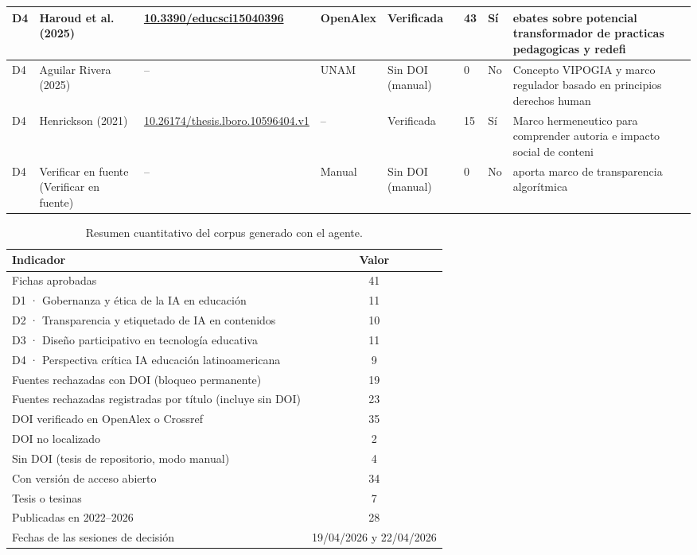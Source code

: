 {\begin{longtable}{|p{0.55cm}|p{2.6cm}|p{2.8cm}|p{1.3cm}|p{1.6cm}|p{0.8cm}|p{0.45cm}|p{2.4cm}|}
\hline
D4 & Haroud et al. (2025) & {\scriptsize \url{10.3390/educsci15040396}} & OpenAlex & Verificada & 43 & Sí & ebates sobre potencial transformador de practicas pedagogicas y redefi \\
\hline
D4 & Aguilar Rivera (2025) & {\scriptsize --} & UNAM & Sin DOI (manual) & 0 & No & Concepto VIPOGIA y marco regulador basado en principios derechos human \\
\hline
D4 & Henrickson (2021) & {\scriptsize \url{10.26174/thesis.lboro.10596404.v1}} & -- & Verificada & 15 & Sí & Marco hermeneutico para comprender autoria e impacto social de conteni \\
\hline
D4 & Verificar en fuente (Verificar en fuente) & {\scriptsize --} & Manual & Sin DOI (manual) & 0 & No & aporta marco de transparencia algorítmica \\
\hline
\end{longtable}}

\begin{table}[H]\centering\footnotesize
\caption{Resumen cuantitativo del corpus generado con el agente.}\label{tab:resumen-corpus}
\renewcommand{\arraystretch}{1.3}
\begin{tabular}{|p{9.5cm}|c|}\hline\rowcolor{bgCotejo}\textbf{Indicador} & \textbf{Valor} \\\hline
Fichas aprobadas & 41 \\\hline
\quad D1 · Gobernanza y ética de la IA en educación & 11 \\\hline
\quad D2 · Transparencia y etiquetado de IA en contenidos & 10 \\\hline
\quad D3 · Diseño participativo en tecnología educativa & 11 \\\hline
\quad D4 · Perspectiva crítica IA educación latinoamericana & 9 \\\hline
Fuentes rechazadas con DOI (bloqueo permanente) & 19 \\\hline
Fuentes rechazadas registradas por título (incluye sin DOI) & 23 \\\hline
DOI verificado en OpenAlex o Crossref & 35 \\\hline
DOI no localizado & 2 \\\hline
Sin DOI (tesis de repositorio, modo manual) & 4 \\\hline
Con versión de acceso abierto & 34 \\\hline
Tesis o tesinas & 7 \\\hline
Publicadas en 2022--2026 & 28 \\\hline
Fechas de las sesiones de decisión & 19/04/2026 y 22/04/2026 \\\hline
\end{tabular}\end{table}

